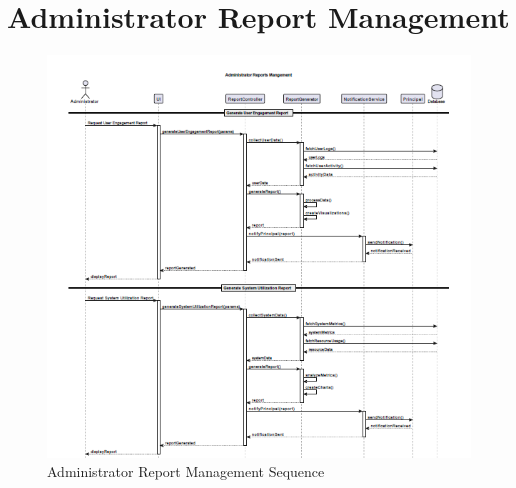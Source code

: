 \documentclass[12pt,a4paper]{report}
\begin{document}
\section{Administrator Report Management}
\begin{figure}[htbp]
    \centering
    \includegraphics[width=1\textwidth]{administrator-report-management-sequence.png}
    \caption{Administrator Report Management Sequence}
    \label{fig:administrator-report-management-sequence}
\end{figure}
\end{document}
